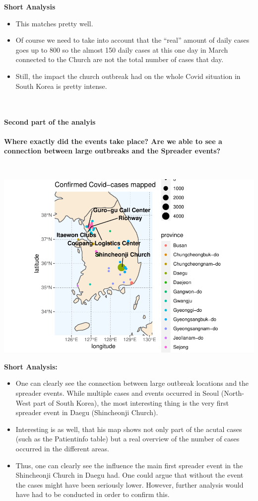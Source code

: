 \documentclass[
]{article}
\providecommand{\tightlist}{%
  \setlength{\itemsep}{0pt}\setlength{\parskip}{0pt}}
\begin{document}
\textbf{Short Analysis}

\begin{itemize}
\tightlist
\item
  This matches pretty well.
\item
  Of course we need to take into account that the ``real'' amount of
  daily cases goes up to 800 so the almost 150 daily cases at this one
  day in March connected to the Church are not the total number of cases
  that day.
\item
  Still, the impact the church outbreak had on the whole Covid situation
  in South Korea is pretty intense.
\end{itemize}

~

\hypertarget{second-part-of-the-analyis}{%
\paragraph{Second part of the
analyis}\label{second-part-of-the-analyis}}

\textbf{Where exactly did the events take place? Are we able to see a
connection between large outbreaks and the Spreader events?}

~

\includegraphics{Main_Analysis_files/figure-latex/unnamed-chunk-20-1.pdf}

\textbf{Short Analysis:}

\begin{itemize}
\tightlist
\item
  One can clearly see the connection between large outbreak locations
  and the spreader events. While multiple cases and events occurred in
  Seoul (North-West part of South Korea), the most interesting thing is
  the very first spreader event in Daegu (Shincheonji Church).
\item
  Interesting is as well, that his map shows not only part of the acutal
  cases (such as the Patientinfo table) but a real overview of the
  number of cases occurred in the different areas.
\item
  Thus, one can clearly see the influence the main first spreader event
  in the Shincheonji Church in Daegu had. One could argue that without
  the event the cases might have been seriously lower. However, further
  analysis would have had to be conducted in order to confirm this.
\end{itemize}
\end{document}
